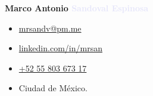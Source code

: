 \documentclass[letterpaper]{article}
\begin{document}
\thispagestyle{empty}
\noindent
\textbf{\Huge \textcolor{darklavender}{Marco Antonio} \textcolor{lavender}{Sandoval Espinosa}}\par

\begin{flushleft}

\end{flushleft}\par

\noindent
\begin{itemize}[itemsep=0em]
\item[\faAt] \href{mailto:mrsandv@pm.me}{mrsandv@pm.me}
\item[\faLinkedin]\href{https://linkedin.com/in/mrsan}{linkedin.com/in/mrsan}
\item[\faPhone] \href{tel:+525580367317}{+52 55 803 673 17}
\item[\faMapMarker] Ciudad de México.
\end{itemize}
\end{document}
